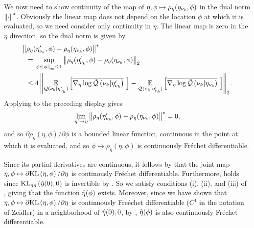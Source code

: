 We now need to show continuity of the map of $\eta, \phi \mapsto
\rho_\eta(\eta_{\nu_{k}}, \phi)$ in the dual norm $\left\Vert\cdot\right\Vert^*$.  Obviously the
linear map does not depend on the location $\phi$ at which it is evaluated, so
we need consider only continuity in $\eta$.  The linear map is zero in the
$\eta$ direction, so the dual norm is given by
%
\begin{align*}
%
\MoveEqLeft
\norm{\rho_\eta(\etanuk', \phi) - \rho_\eta(\etanuk, \phi)}^* \\={}&
\sup_{\phi: \norminf{\phi} \le 1}
    \norm{\rho_\eta(\etanuk', \phi) - \rho_\eta(\etanuk, \phi)}_2 \\\le{}&
4 \norm{
    \expect{\q(\nuk \vert \etanuk')}{\lqgradbar{\nuk \vert \etanuk'}} -
    \expect{\q(\nuk \vert \etanuk')}{\lqgradbar{\nuk \vert \etanuk}}
}_2.
%
\end{align*}
%
Applying  to the preceding display gives
%
\begin{align*}
%
\lim_{\eta' \rightarrow \eta}
    \norm{\rho_\eta(\etanuk', \phi) - \rho_\eta(\etanuk, \phi)}^* = 0,
%
\end{align*}
%
and so $\partial \rho_\eta(\eta, \phi) / \partial \phi$ is a bounded linear
function, continuous in the point at which it is evaluated, and so $\phi \mapsto
\rho_\eta(\eta, \phi)$ is continuously Fr{\'e}chet differentiable.

Since its partial derivatives are continuous, it follows by \citet[Proposition
4.14(c)]{zeidler:2013:functional} that the joint map $\eta, \phi \mapsto
\partial \mathrm{KL}\left(\eta, \phi\right) / \partial \eta$ is continously Fr{\'e}chet
differentiable.  Furthermore, \citet[Chapter 4 Condition
21b]{zeidler:2013:functional} holds since $\mathrm{KL}_{\eta\eta}\left(\hat\eta(0), 0\right)$ is
invertible by .   So we satisfy conditions (i),
(ii), and (iii) of \citet[Theorem 4.B(c)]{zeidler:2013:functional}, giving that
the function $\hat\eta(\phi)$ exists.  Moreover, since we have shown that $\eta,
\phi \mapsto \partial \mathrm{KL}\left(\eta, \phi\right) / \partial \eta$ is continuously
Fre{\'e}chet differentiable ($C^1$ in the notation of Zeidler) in a neighborhood
of $\hat\eta(0), 0$, by \citet[Theorem 4.B(d)]{zeidler:2013:functional},
$\hat\eta(\phi)$ is also continuously Fr{\'e}chet differentiable.

